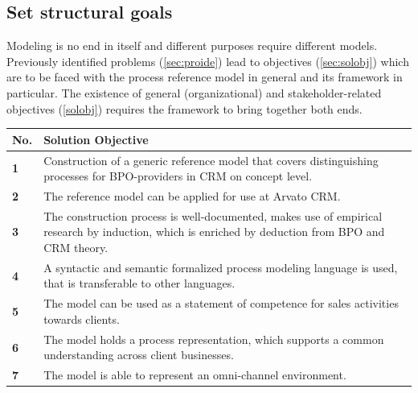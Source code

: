 	\subsection{Set structural goals}
	
	Modeling is no end in itself and different purposes require different models. Previously identified problems (\ref{sec:proide}) lead to objectives (\ref{sec:solobj}) which are to be faced with the process reference model in general and its framework in particular. The existence of general (organizational) and stakeholder-related objectives (\cf \Tab \ref{solobj}) requires the framework to bring together both ends.
	
	\begin{table}[caption={Solution Objectives}, label={tab:solobj}]
		\centering
		\begin{tabular}{l p{13.3cm}}

			\textbf{No. }&\textbf{ Solution Objective}
			 \\ \hline
			\textbf{1 }                        & Construction of a generic reference model that covers distinguishing processes for BPO-providers in CRM on concept level.                                                    \\ \hline
			\textbf{2}                         & The reference model can be applied for use at Arvato CRM.                                                                                                                    \\ \hline
			\textbf{3 }                        & The construction process is well-documented, makes use of empirical research by induction, which is enriched by deduction from \acrshort{BPO} and \acrshort{CRM} theory. \\ \hline
			\textbf{4}                         & A syntactic and semantic formalized process modeling language is used, that is transferable to other languages.                                                              \\ \hline
			\textbf{5}                         & The model can be used as a statement of competence for sales activities towards clients.                                                                                     \\ \hline
			\textbf{6}                         & The model holds a process representation, which supports a common understanding across client businesses.                                                                    \\ \hline
			\textbf{7}                         & The model is able to represent an omni-channel environment.                                                                                                                 
		\end{tabular}
	\end{table}

